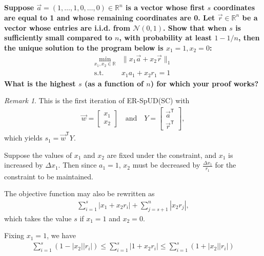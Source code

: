 \documentclass[a4paper,12pt]{article}
\theoremstyle{remark}
\newtheorem{remark}{Remark}[subsection]
\newcommand{\transpose}{\mathsf{T}}
\begin{document}
\subsection{}
    \boldmath\textbf{Suppose $\vec{a} = (1,\dots,1,0,\dots,0) \in \mathbb{R}^{n}$ is a vector whose first $s$ coordinates are equal to 1 and whose remaining coordinates are 0. Let $\vec{r} \in \mathbb{R}^{n}$ be a vector whose entries are i.i.d. from $\mathcal{N}(0,1)$. Show that when $s$ is sufficiently small compared to $n$, with probability at least $1 - 1/n$, then the unique solution to the program below is $x_1=1, x_2=0$:
    \begin{align*}
        \min_{x_{1}, x_{2} \in \mathbb{R}} & \|x_{1}\vec{a} + x_{2}\vec{r}\|_{1}\\  \mbox{s.t. } & x_{1}a_1 + x_{2}r_1 = 1
    \end{align*}
    What is the highest $s$ (as a function of $n$) for which your proof works?
    }\unboldmath \par
    \begin{remark}
        This is the first iteration of ER-SpUD(SC) \cite{dictionary} with
        \begin{gather*}
            \vec{w} = \left[ \begin{array}{c}
                    x_1 \\
                    x_2
            \end{array} \right] \quad \text{and} \quad
            Y = \left[ \begin{array}{c}
                    \vec{a}^\transpose \\
                    \vec{r}^\transpose
            \end{array} \right],
        \end{gather*}
        which yields $s_1 = \vec{w}^\transpose Y$.
    \end{remark}
    Suppose the values of $x_1$ and $x_2$ are fixed under the constraint, and $x_1$ is increased by $\Delta x_1$. Then since $a_1 = 1$, $x_2$ must be decreased by $\frac{\Delta x_1}{r_1}$ for the constraint to be maintained. \par
    The objective function may also be rewritten as
    \begin{align*}
        \sum_{i = 1}^s |x_1 + x_2 r_i| + \sum_{j = s + 1}^n |x_2 r_j|,
    \end{align*}
    which takes the value $s$ if $x_1 = 1$ and $x_2 = 0$. \par
    Fixing $x_1 = 1$, we have
    \begin{align*}
        \sum_{i = 1}^s (1 - |x_2||r_i|) \leq \sum_{i = 1}^s |1 + x_2 r_i| \leq \sum_{i = 1}^s (1 + |x_2||r_i|)
    \end{align*}
\end{document}
